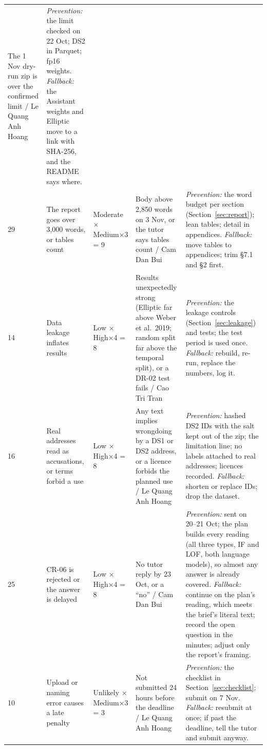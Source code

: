 {\begin{longtable}{@{}L{0.7cm}L{3.2cm}L{2.0cm}L{3.4cm}L{4.6cm}@{}}
The 1 Nov dry-run zip is over the confirmed limit / Le Quang Anh Hoang &
\textit{Prevention:} the limit checked on 22 Oct; DS2 in Parquet; fp16 weights. \textit{Fallback:}
the Assistant weights and Elliptic move to a link with SHA-256, and the README says where. \\
29 & The report goes over 3,000 words, or tables count & Moderate × Medium×3 = 9 &
Body above 2,850 words on 3 Nov, or the tutor says tables count / Cam Dan Bui &
\textit{Prevention:} the word budget per section (Section~\ref{sec:report}); lean tables; detail in
appendices. \textit{Fallback:} move tables to appendices; trim §7.1 and §2 first. \\
14 & Data leakage inflates results & Low × High×4 = 8 &
Results unexpectedly strong (Elliptic far above Weber et al.\ 2019; random split far above the
temporal split), or a DR-02 test fails / Cao Tri Tran &
\textit{Prevention:} the leakage controls (Section~\ref{sec:leakage}) and tests; the test period is
used once. \textit{Fallback:} rebuild, re-run, replace the numbers, log it. \\
16 & Real addresses read as accusations, or terms forbid a use & Low × High×4 = 8 &
Any text implies wrongdoing by a DS1 or DS2 address, or a licence forbids the planned use / Le
Quang Anh Hoang &
\textit{Prevention:} hashed DS2 IDs with the salt kept out of the zip; the limitation line; no
labels attached to real addresses; licences recorded. \textit{Fallback:} shorten or replace IDs;
drop the dataset. \\
25 & CR-06 is rejected or the answer is delayed & Low × High×4 = 8 &
No tutor reply by 23 Oct, or a ``no'' / Cam Dan Bui &
\textit{Prevention:} sent on 20--21 Oct; the plan builds every reading (all three types, IF and LOF,
both language models), so almost any answer is already covered. \textit{Fallback:} continue on
the plan's reading, which meets the brief's literal text; record the open question in the
minutes; adjust only the report's framing. \\
10 & Upload or naming error causes a late penalty & Unlikely × Medium×3 = 3 &
Not submitted 24 hours before the deadline / Le Quang Anh Hoang &
\textit{Prevention:} the checklist in Section~\ref{sec:checklist}; submit on 7 Nov.
\textit{Fallback:} resubmit at once; if past the deadline, tell the tutor and submit anyway. \\
\bottomrule
\end{longtable}
}

